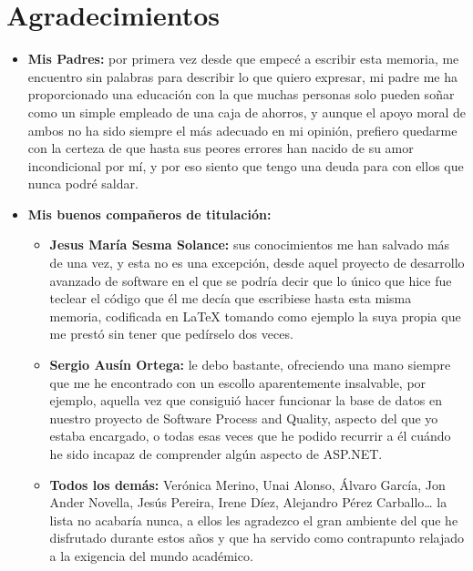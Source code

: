 \chapter*{Agradecimientos}

\begin{itemize}

\item \textbf{Mis Padres:} por primera vez desde que empecé a escribir esta memoria, me encuentro sin palabras para describir lo que quiero expresar, mi padre me ha proporcionado una educación con la que muchas personas solo pueden soñar como un simple empleado de una caja de ahorros, y aunque el apoyo moral de ambos no ha sido siempre el más adecuado en mi opinión, prefiero quedarme con la certeza de que hasta sus peores errores han nacido de su amor incondicional por mí, y por eso siento que tengo una deuda para con ellos que nunca podré saldar.

\item \textbf{Mis buenos compañeros de titulación:}
\begin{itemize}
\item \textbf{Jesus María Sesma Solance:} sus conocimientos me han salvado más de una vez, y esta no es una excepción, desde aquel proyecto de desarrollo avanzado de software en el que se podría decir que lo único que hice fue teclear el código que él me decía que escribiese hasta esta misma memoria, codificada en LaTeX tomando como ejemplo la suya propia que me prestó sin tener que pedírselo dos veces.
\item \textbf{Sergio Ausín Ortega:}  le debo bastante, ofreciendo una mano siempre que me he encontrado con un escollo aparentemente insalvable, por ejemplo, aquella vez que consiguió hacer funcionar la base de datos en nuestro proyecto de Software Process and Quality, aspecto del que yo estaba encargado, o todas esas veces que he podido recurrir a él cuándo he sido incapaz de comprender algún aspecto de ASP.NET.
\item \textbf{Todos los demás:} Verónica Merino, Unai Alonso, Álvaro García, Jon Ander Novella, Jesús Pereira, Irene Díez, Alejandro Pérez Carballo… la lista no acabaría nunca, a ellos les agradezco el gran ambiente del que he disfrutado durante estos años y que ha servido como contrapunto relajado a la exigencia del mundo académico.
\end{itemize}


\end{itemize}
